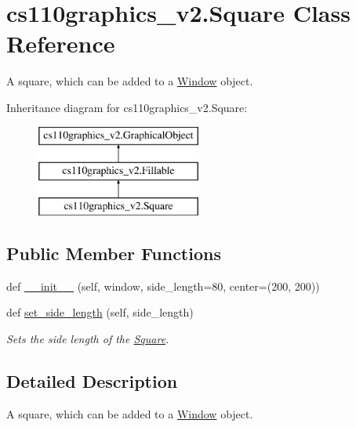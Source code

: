 \hypertarget{classcs110graphics__v2_1_1Square}{}\section{cs110graphics\+\_\+v2.\+Square Class Reference}
\label{classcs110graphics__v2_1_1Square}


A square, which can be added to a \mbox{\hyperlink{classcs110graphics__v2_1_1Window}{Window}} object.  


Inheritance diagram for cs110graphics\+\_\+v2.\+Square\+:\begin{figure}[H]
\begin{center}
\leavevmode
\includegraphics[height=3.000000cm]{classcs110graphics__v2_1_1Square}
\end{center}
\end{figure}
\subsection*{Public Member Functions}
\begin{DoxyCompactItemize}
\item 
def \mbox{\hyperlink{classcs110graphics__v2_1_1Square_a32f0f876b25952d97fdc2205f3f47ec5}{\+\_\+\+\_\+init\+\_\+\+\_\+}} (self, window, side\+\_\+length=80, center=(200, 200))
\item 
def \mbox{\hyperlink{classcs110graphics__v2_1_1Square_a99bd5bd416642fa4ad073370a2c1f512}{set\+\_\+side\+\_\+length}} (self, side\+\_\+length)
\begin{DoxyCompactList}\small\item\em Sets the side length of the \mbox{\hyperlink{classcs110graphics__v2_1_1Square}{Square}}. \end{DoxyCompactList}\end{DoxyCompactItemize}


\subsection{Detailed Description}
A square, which can be added to a \mbox{\hyperlink{classcs110graphics__v2_1_1Window}{Window}} object. 



